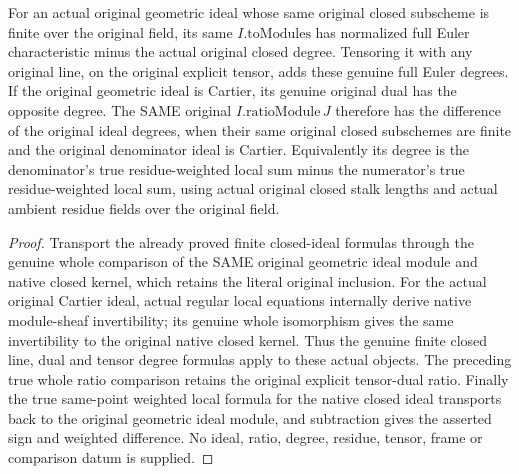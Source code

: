 \begin{theorem}
\label{thm:fc-geometric-ideal-euler-degree}
\leanok
{}
For an actual original geometric ideal whose same original closed subscheme
is finite over the original field, its same $I.\mathrm{toModules}$ has
normalized full Euler characteristic minus the actual original closed degree.
Tensoring it with any original line, on the original explicit tensor,
adds these genuine full Euler degrees. If the original geometric ideal is
Cartier, its genuine original dual has the opposite degree.
The SAME original $I.\mathrm{ratioModule}\,J$ therefore has the difference
of the original ideal degrees, when their same original closed subschemes
are finite and the original denominator ideal is Cartier. Equivalently its
degree is the denominator's true residue-weighted local sum minus the
numerator's true residue-weighted local sum, using actual original closed
stalk lengths and actual ambient residue fields over the original field.
\end{theorem}
\begin{proof}
Transport the already proved finite closed-ideal formulas through the genuine
whole comparison of the SAME original geometric ideal module and native
closed kernel, which retains the literal original inclusion. For the actual
original Cartier ideal, actual regular local equations internally derive
native module-sheaf invertibility; its genuine whole isomorphism gives the
same invertibility to the original native closed kernel. Thus the genuine
finite closed line, dual and tensor degree formulas apply to these actual
objects. The preceding true whole ratio comparison retains the original
explicit tensor-dual ratio. Finally the true same-point weighted local
formula for the native closed ideal transports back to the original
geometric ideal module, and subtraction gives the asserted sign and weighted
difference. No ideal, ratio, degree, residue, tensor, frame or comparison
datum is supplied.
\end{proof}
